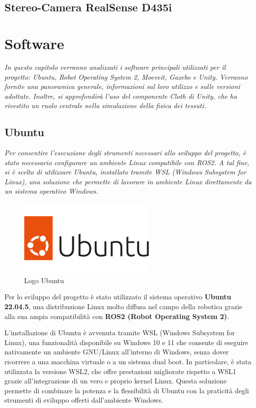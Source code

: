 \documentclass[11pt]{report}
\begin{document}
\subsection{Stereo-Camera RealSense D435i}

\section{Software}
\textit{In questo capitolo verranno analizzati i software principali utilizzati per il progetto: Ubuntu, Robot Operating System 2, Moeveit, Gazebo e Unity. Verranno fornite una panoramica generale, informazioni sul loro utilizzo e sulle versioni adottate. Inoltre, si approfondirà l'uso del componente Cloth di Unity, che ha rivestito un ruolo centrale nella simulazione della fisica dei tessuti.}

\subsection{Ubuntu}
\textit{Per consentire l’esecuzione degli strumenti necessari allo sviluppo del progetto, è stato necessario configurare un ambiente Linux compatibile con ROS2. A tal fine, si è scelto di utilizzare Ubuntu, installato tramite WSL (Windows Subsystem for Linux), una soluzione che permette di lavorare in ambiente Linux direttamente da un sistema operativo Windows.}

\begin{figure}[H]
    \centering
    \includegraphics[width=0.6\textwidth]{images/ubuntu1.png}
    \caption{Logo Ubuntu}
    \label{fig:Ubuntu}
\end{figure}

Per lo sviluppo del progetto è stato utilizzato il sistema operativo \textbf{Ubuntu 22.04.5}, una distribuzione Linux molto diffusa nel campo della robotica grazie alla sua ampia compatibilità con \textbf{ROS2 (Robot Operating System 2)}.

L’installazione di Ubuntu è avvenuta tramite WSL (Windows Subsystem for Linux), una funzionalità disponibile su Windows 10 e 11 che consente di eseguire nativamente un ambiente GNU/Linux all’interno di Windows, senza dover ricorrere a una macchina virtuale o a un sistema dual boot.
In particolare, è stata utilizzata la versione WSL2, che offre prestazioni migliorate rispetto a WSL1 grazie all’integrazione di un vero e proprio kernel Linux. Questa soluzione permette di combinare la potenza e la flessibilità di Ubuntu con la praticità degli strumenti di sviluppo offerti dall’ambiente Windows.
\end{document}
